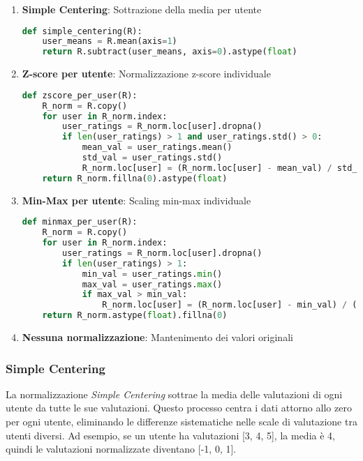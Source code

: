 \begin{enumerate}
    \item \textbf{Simple Centering}: Sottrazione della media per utente
    \begin{lstlisting}[language=Python]
def simple_centering(R):
    user_means = R.mean(axis=1)
    return R.subtract(user_means, axis=0).astype(float)
    \end{lstlisting}
    
    \item \textbf{Z-score per utente}: Normalizzazione z-score individuale
    \begin{lstlisting}[language=Python]
def zscore_per_user(R):
    R_norm = R.copy()
    for user in R_norm.index:
        user_ratings = R_norm.loc[user].dropna()
        if len(user_ratings) > 1 and user_ratings.std() > 0:
            mean_val = user_ratings.mean()
            std_val = user_ratings.std()
            R_norm.loc[user] = (R_norm.loc[user] - mean_val) / std_val
    return R_norm.fillna(0).astype(float)
    \end{lstlisting}
    
    \item \textbf{Min-Max per utente}: Scaling min-max individuale
    \begin{lstlisting}[language=Python]
def minmax_per_user(R):
    R_norm = R.copy()
    for user in R_norm.index:
        user_ratings = R_norm.loc[user].dropna()
        if len(user_ratings) > 1:
            min_val = user_ratings.min()
            max_val = user_ratings.max()
            if max_val > min_val:
                R_norm.loc[user] = (R_norm.loc[user] - min_val) / (max_val - min_val)
    return R_norm.astype(float).fillna(0)
    \end{lstlisting}
    
    \item \textbf{Nessuna normalizzazione}: Mantenimento dei valori originali
\end{enumerate}

\subsubsection{Simple Centering}
La normalizzazione \textit{Simple Centering} sottrae la media delle valutazioni di ogni utente da tutte le sue valutazioni. Questo processo centra i dati attorno allo zero per ogni utente, eliminando le differenze sistematiche nelle scale di valutazione tra utenti diversi. Ad esempio, se un utente ha valutazioni [3, 4, 5], la media è 4, quindi le valutazioni normalizzate diventano [-1, 0, 1].


